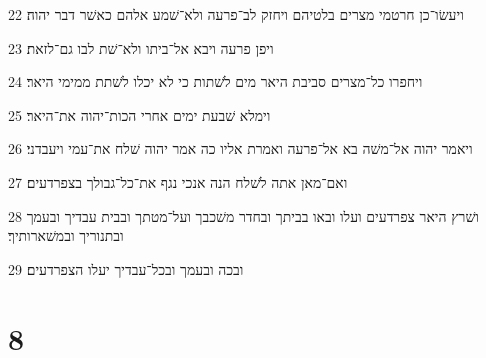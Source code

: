 \par 22 ויעשׂו־כן חרטמי מצרים בלטיהם ויחזק לב־פרעה ולא־שׁמע אלהם כאשׁר דבר יהוה׃
\par 23 ויפן פרעה ויבא אל־ביתו ולא־שׁת לבו גם־לזאת׃
\par 24 ויחפרו כל־מצרים סביבת היאר מים לשׁתות כי לא יכלו לשׁתת ממימי היאר׃
\par 25 וימלא שׁבעת ימים אחרי הכות־יהוה את־היאר׃
\par 26 ויאמר יהוה אל־משׁה בא אל־פרעה ואמרת אליו כה אמר יהוה שׁלח את־עמי ויעבדני׃
\par 27 ואם־מאן אתה לשׁלח הנה אנכי נגף את־כל־גבולך בצפרדעים׃
\par 28 ושׁרץ היאר צפרדעים ועלו ובאו בביתך ובחדר משׁכבך ועל־מטתך ובבית עבדיך ובעמך ובתנוריך ובמשׁארותיך׃
\par 29 ובכה ובעמך ובכל־עבדיך יעלו הצפרדעים׃

\chapter{8}

